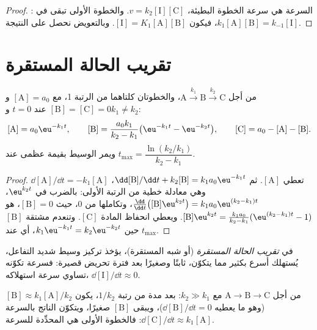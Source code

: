\begin{proof}
السرعة هي سرعة الخطوة البطيئة، $v = k_2[\mathrm{I}][\mathrm{C}]$.
والخطوة الأولى تبقى في : $k_1[\mathrm{A}][\mathrm{B}] =
k_{-1}[\mathrm{I}]$، فيكون $[\mathrm{I}] = K_1[\mathrm{A}][\mathrm{B}]$.
وبالتعويض نحصل على النتيجة.
\end{proof}

\section{تقريب الحالة المستقرة}

\begin{theorem}\label{thm:b1:elementary-steps:consecutive}
من أجل $\mathrm{A} \xrightarrow{k_1} \mathrm{B} \xrightarrow{k_2} \mathrm{C}$،
والخطوتان كلتاهما من الرتبة 1، مع $[\mathrm{A}] = a_0$ و$[\mathrm{B}] =
[\mathrm{C}] = 0$ عند $t = 0$ و$k_1 \ne k_2$:
\[
  [\mathrm{A}] = a_0\eu^{-k_1t}, \qquad
  [\mathrm{B}] = \frac{a_0k_1}{k_2 - k_1}\big(\eu^{-k_1t} - \eu^{-k_2t}\big),
  \qquad [\mathrm{C}] = a_0 - [\mathrm{A}] - [\mathrm{B}] .
\]
ويمر الوسيط بقيمة عظمى عند $t_{\max} = \dfrac{\ln(k_2/k_1)}
{k_2 - k_1}$.
\end{theorem}

\begin{proof}
$\dd[\mathrm{A}]/\dd t = -k_1[\mathrm{A}]$ تعطي $[\mathrm{A}]$. ثم
$\dd[\mathrm{B}]/\dd t + k_2[\mathrm{B}] = k_1a_0\eu^{-k_1t}$، وهي معادلة خطية
من الرتبة الأولى: بالضرب في $\eu^{k_2t}$، $\frac{\dd}{\dd t}
\big([\mathrm{B}]\eu^{k_2t}\big) = k_1a_0\eu^{(k_2-k_1)t}$، وتكاملها
من 0، حيث $[\mathrm{B}] = 0$، هو $[\mathrm{B}]\eu^{k_2t} =
\frac{k_1a_0}{k_2-k_1}(\eu^{(k_2-k_1)t} - 1)$. ويعطي انحفاظ المادة
$[\mathrm{C}]$. وتنعدم مشتقة $[\mathrm{B}]$ حين $k_1\eu^{-k_1t}
= k_2\eu^{-k_2t}$، أي عند $t_{\max}$.
\end{proof}

\begin{definition}\label{def:b1:elementary-steps:qssa}
في \emph{تقريب الحالة المستقرة}
(أو شبه المستقرة)، يؤخذ تركيز وسيط شديد
التفاعل، يُستهلك أسرع بكثير مما يتكوّن، ثابتًا
وصغيرًا بعد فترة تحريض قصيرة: فسرعة
تكوّنه تساوي سرعة استهلاكه،
$\dd[\mathrm{I}]/\dd t \approx 0$.
\end{definition}

\begin{proposition}\label{prop:b1:elementary-steps:qssa-justified}
من أجل $\mathrm{A} \to \mathrm{B} \to \mathrm{C}$ مع $k_2 \gg k_1$: بعد
مدة من رتبة $1/k_2$، يكون $[\mathrm{B}] \approx k_1[\mathrm{A}]/k_2$ (وهو
ما يعطيه $\dd[\mathrm{B}]/\dd t = 0$)، ويبقى $[\mathrm{B}]$ صغيرًا، ويتكوّن
الناتج بالسرعة $\dd[\mathrm{C}]/\dd t \approx k_1[\mathrm{A}]$:
فالخطوة الأولى هي المحدِّدة للسرعة.
\end{proposition}

